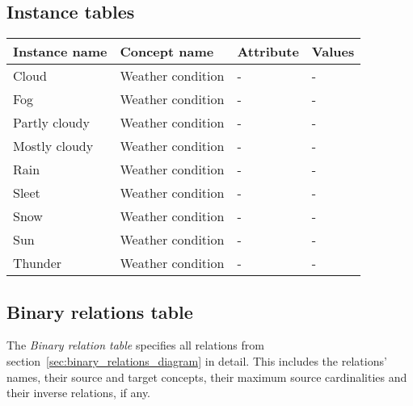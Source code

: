 \subsection{Instance tables}
\label{subsec:appendix_instance_tables}

\begin{longtable}{|p{}|p{}|p{}|p{}|}
  \hline
  \textbf{Instance name} & \textbf{Concept name} & \textbf{Attribute} & \textbf{Values} \\
  \hline\hline
  Cloud & Weather condition & - & - \\
  \hline
  Fog & Weather condition & - & - \\
  \hline
  Partly cloudy & Weather condition & - & - \\
  \hline
  Mostly cloudy & Weather condition & - & - \\
  \hline
  Rain & Weather condition & - & - \\
  \hline
  Sleet & Weather condition & - & - \\
  \hline
  Snow & Weather condition & - & - \\
  \hline
  Sun & Weather condition & - & - \\
  \hline
  Thunder & Weather condition & - & - \\
  \hline
\end{longtable}

\subsection{Binary relations table}
\label{subsec:appendix_binary_relations_table}

The \emph{Binary relation table} specifies all relations from section~\ref{sec:binary_relations_diagram} in detail. This includes the relations' names, their source and target concepts, their maximum source cardinalities and their inverse relations, if any.

